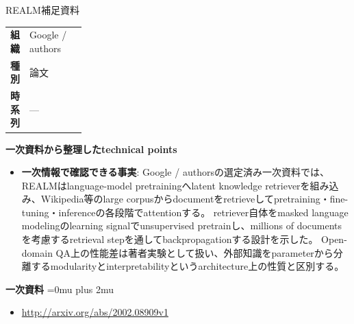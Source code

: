 \begin{technicalnote}{REALM}{補足資料}
\begingroup
\begin{tabularx}{\linewidth}{@{}>{\bfseries}p{0.22\linewidth}X@{}}
組織 & Google / authors \\
種別 & 論文 \\
時系列 & — \\
\end{tabularx}
\smallskip
{\bfseries 一次資料から整理したtechnical points}
\begin{itemize}[leftmargin=1.5em,itemsep=0.35em]
\item \textbf{一次情報で確認できる事実}: Google / authorsの選定済み一次資料では、REALMはlanguage-model pretrainingへlatent knowledge retrieverを組み込み、Wikipedia等のlarge corpusからdocumentをretrieveしてpretraining・fine-tuning・inferenceの各段階でattentionする。 retriever自体をmasked language modelingのlearning signalでunsupervised pretrainし、millions of documentsを考慮するretrieval stepを通してbackpropagationする設計を示した。 Open-domain QA上の性能差は著者実験として扱い、外部知識をparameterから分離するmodularityとinterpretabilityというarchitecture上の性質と区別する。
\end{itemize}
\begin{minipage}{\linewidth}
\begin{samepage}
{\bfseries 一次資料}
\begingroup\sloppy
\Urlmuskip=0mu plus 2mu\relax
\begin{itemize}[leftmargin=1.5em,itemsep=0.25em]
\item {\scriptsize\url{http://arxiv.org/abs/2002.08909v1}}
\end{itemize}
\endgroup
\end{samepage}
\end{minipage}
\endgroup
\end{technicalnote}
\medskip
